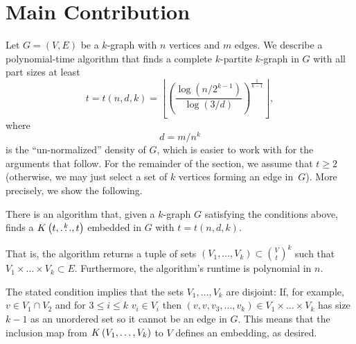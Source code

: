 
\section{Main Contribution}\label{sec:algorithm}
Let $G = (V, E)$ be a $k$-graph with $n$ vertices and $m$ edges.
We describe a polynomial-time algorithm that finds a complete $k$-partite $k$-graph in $G$
with all part sizes at least
\begin{equation}
     t = t (n, d, k) = \left\lfloor \left(  \frac{\log (n/2^{k-1})}{\log (3/d)} \right)^{\frac{1}{k-1}} \right\rfloor \label{eq:t},
\end{equation}
where
\begin{equation} \label{eq:d}
    d = m/n^k
\end{equation}
is the ``un-normalized'' density of $G$,
which is easier to work with for the arguments that follow.
For the remainder of the section, we assume that
$t \geq 2$ (otherwise, we may just select a set of $k$ vertices forming an edge in~$G$).
More precisely, we show the following.
\begin{theorem}\label{thm:kpartite}
    There is an algorithm that, given a $k$-graph $G$ satisfying the conditions above,
    finds a $K\left(t, \overset{k}{\dots}, t\right)$ embedded in $G$ with $t = t(n, d, k)$.

    That is, the algorithm returns a tuple of sets ${(V_1, \dots, V_k) \subset \binom{V}{t}^k}$ such that
    $V_1 \times \dots \times V_k \subset E$.
    Furthermore, the algorithm's runtime is polynomial in $n$.
\end{theorem}

\begin{remark}
    The stated condition implies that the sets $V_1, \dots, V_k$ are disjoint:
    If, for example, $v \in V_1 \cap V_2$ and for $3 \leq i \leq k$ $v_i \in V_i$ then
    $(v, v, v_3, \dots, v_k) \in V_1 \times \dots \times V_k$ has size $k-1$ as an unordered set so it cannot
    be an edge in $G$.
    This means that the inclusion map from $K\left(V_1, \dots, V_k\right)$ to $V$ defines an embedding, as desired.
\end{remark}

